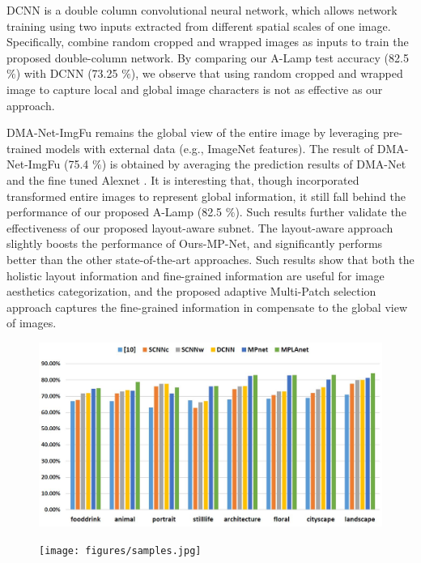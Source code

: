 \documentclass[10pt,twocolumn,letterpaper]{article}
\begin{document}
DCNN is a double column convolutional neural network, which allows network
training using two inputs extracted from different spatial scales of one image.
Specifically, \cite{Lu:2014:TMM:rating} combine random cropped and wrapped images as inputs to train the proposed double-column network. By comparing our A-Lamp test accuracy (82.5 $\%$) with DCNN (73.25 $\%$), we observe that using random cropped and wrapped image to capture local and global image characters is not as effective as our approach.  

DMA-Net-ImgFu remains the global view of the entire image \cite{Lu:2015:ICCV} by leveraging pre-trained models with external data (e.g., ImageNet features). The result of DMA-Net-ImgFu (75.4 $\%$) is obtained by averaging the prediction results of DMA-Net and the fine tuned Alexnet \cite{Alex:2012:NIPS:ImageNet}. It is interesting that, though \cite{Lu:2015:ICCV} incorporated transformed entire images to represent global information, it still fall behind the performance of our proposed A-Lamp (82.5 $\%$). Such results further validate the effectiveness of our proposed layout-aware subnet. The layout-aware approach slightly boosts the performance of Ours-MP-Net, and significantly performs better than the other state-of-the-art approaches. Such results show that both the holistic layout information and fine-grained information are useful for image aesthetics categorization, and the proposed adaptive Multi-Patch selection approach captures the fine-grained information in compensate to the global view of images. 


\begin{figure} [!t]
	\centering
	\includegraphics[scale=0.3]{figures/category.jpg}
	\label{category}
\end{figure}

\begin{figure} [!t]
	\centering
	\texttt{[image: figures/samples.jpg]}
	\label{samples}
\end{figure}
\end{document}

